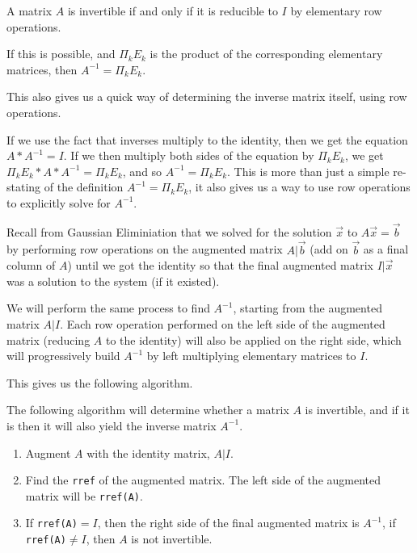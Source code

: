 \documentclass{ximera}
\begin{document}
\begin{theorem}\label{th:prod-elementary}
  A matrix $A$ is invertible if and
  only if it is reducible to $I$ by elementary row operations.

  If this is possible, and $\Pi_kE_k$ is the product of the corresponding elementary matrices, then $A^{-1}=\Pi_kE_k$.
\end{theorem}

This also gives us a quick way of determining the inverse matrix itself, using row operations.

\begin{remark}
  If we use the fact that inverses multiply to the identity, then we get the equation $A*A^{-1}=I$. If we then multiply both sides of the equation by $\Pi_kE_k$, we get $\Pi_kE_k*A*A^{-1}=\Pi_kE_k$, and so $A^{-1}=\Pi_kE_k$. This is more than just a simple re-stating of the definition $A^{-1}=\Pi_kE_k$, it also gives us a way to use row operations to explicitly solve for $A^{-1}$. 
  
  Recall from Gaussian Eliminiation that we solved for the solution $\vec{x}$ to $A\vec{x}=\vec{b}$ by performing row operations on the augmented matrix $A|\vec{b}$ (add on $\vec{b}$ as a final column of $A$) until we got the identity so that the final augmented matrix $I|\vec{x}$ was a solution to the system (if it existed).

  We will perform the same process to find $A^{-1}$, starting from the augmented matrix $A|I$. Each row operation performed on the left side of the augmented matrix (reducing $A$ to the identity) will also be applied on the right side, which will progressively build $A^{-1}$ by left multiplying elementary matrices to $I$.
\end{remark}

This gives us the following algorithm. 

\begin{theorem}\label{thm:prod-elementary}
  The following algorithm will determine whether a matrix $A$ is invertible, and if it is then it will also yield the inverse matrix $A^{-1}$.
  \begin{enumerate}
    \item Augment $A$ with the identity matrix, $A|I$.
    \item Find the \texttt{rref} of the augmented matrix. The left side of the augmented matrix will be \texttt{rref(A)}.
    \item If \texttt{rref(A)}$=I$, then the right side of the final augmented matrix is $A^{-1}$, if \texttt{rref(A)}$\neq I$, then $A$ is not invertible.
  \end{enumerate}
\end{theorem}
\end{document}
